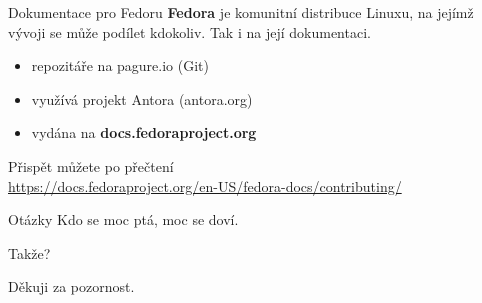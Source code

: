 \documentclass[12pt]{beamer}
\begin{document}
	\begin{frame}{Dokumentace pro Fedoru}
\textbf{Fedora} je komunitní distribuce Linuxu, na jejímž vývoji se může podílet kdokoliv. Tak i na její dokumentaci.

	\begin{itemize}
		\item repozitáře na pagure.io (Git)
		\item využívá projekt Antora (antora.org)
		\item vydána na \textbf{docs.fedoraproject.org}
	\end{itemize}

	Přispět můžete po přečtení \\
	\url{https://docs.fedoraproject.org/en-US/fedora-docs/contributing/}

	\end{frame}


	\begin{frame}{Otázky}
		Kdo se moc ptá, moc se doví.
		
		\vspace{10pt}
		
		Takže?
	\end{frame}

	\begin{frame}
	Děkuji za pozornost.
	\end{frame}
\end{document}
